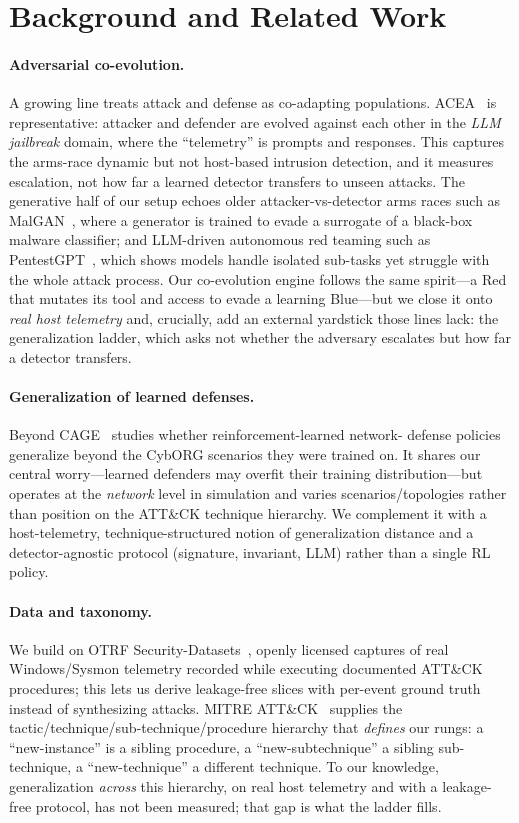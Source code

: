 \documentclass[sigconf,nonacm]{acmart}
\begin{document}
\section{Background and Related Work}
\label{sec:related}

\paragraph{Adversarial co-evolution.}
A growing line treats attack and defense as co-adapting populations. ACEA~\cite{acea}
is representative: attacker and defender are evolved against each other in the
\emph{LLM jailbreak} domain, where the ``telemetry'' is prompts and responses.
This captures the arms-race dynamic but not host-based intrusion detection, and
it measures escalation, not how far a learned detector transfers to unseen
attacks. The generative half of our setup echoes older attacker-vs-detector
arms races such as MalGAN~\cite{malgan}, where a generator is trained to evade a
surrogate of a black-box malware classifier; and LLM-driven autonomous red
teaming such as PentestGPT~\cite{pentestgpt}, which shows models handle isolated
sub-tasks yet struggle with the whole attack process. Our co-evolution engine
follows the same spirit---a Red that mutates its tool and access to evade a
learning Blue---but we close it onto \emph{real host telemetry} and, crucially,
add an external yardstick those lines lack: the generalization ladder, which
asks not whether the adversary escalates but how far a detector transfers.

\paragraph{Generalization of learned defenses.}
Beyond CAGE~\cite{beyondcage} studies whether reinforcement-learned network-%
defense policies generalize beyond the CybORG scenarios they were trained on.
It shares our central worry---learned defenders may overfit their training
distribution---but operates at the \emph{network} level in simulation and varies
scenarios/topologies rather than position on the ATT\&CK technique hierarchy.
We complement it with a host-telemetry, technique-structured notion of
generalization distance and a detector-agnostic protocol (signature, invariant,
LLM) rather than a single RL policy.

\paragraph{Data and taxonomy.}
We build on OTRF Security-Datasets~\cite{otrf}, openly licensed captures of real
Windows/Sysmon telemetry recorded while executing documented ATT\&CK
procedures; this lets us derive leakage-free slices with per-event ground truth
instead of synthesizing attacks. MITRE ATT\&CK~\cite{attack} supplies the
tactic/technique/sub-technique/procedure hierarchy that \emph{defines} our
rungs: a ``new-instance'' is a sibling procedure, a ``new-subtechnique'' a
sibling sub-technique, a ``new-technique'' a different technique. To our
knowledge, generalization \emph{across} this hierarchy, on real host telemetry
and with a leakage-free protocol, has not been measured; that gap is what the
ladder fills.
\end{document}
